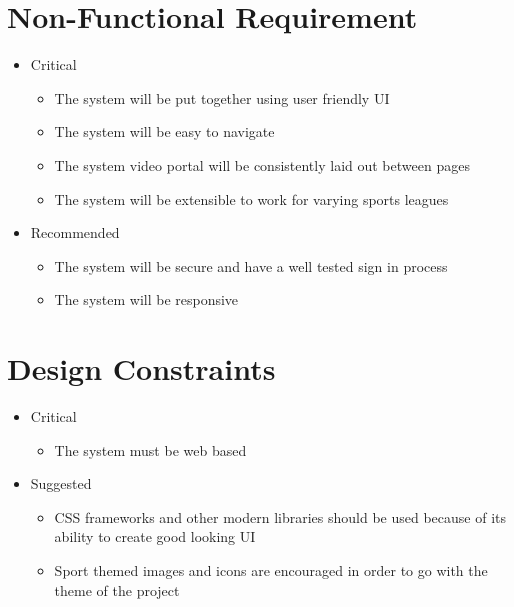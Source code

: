 \section{Non-Functional Requirement}
	\begin{itemize}
    \item Critical 
    	\begin{itemize}
    	\item The system will be put together using user friendly UI 
        \item The system will be  easy to  navigate 
        \item The system video portal will be consistently laid out between pages
        \item The system will be extensible to work for varying sports leagues        
    	\end{itemize}
    \item Recommended
    	\begin{itemize}
        \item The system will be secure and have a well tested sign in process 
        \item The system will be responsive 
    	\end{itemize}
	\end{itemize}
\section{Design Constraints}
	\begin{itemize}
    \item Critical
    	\begin{itemize}
    	\item The system must be web based 
    	\end{itemize}
	\item Suggested
    	\begin{itemize}
        \item CSS frameworks and other modern libraries should be used because of its ability to create good looking UI 
        \item Sport themed images and icons are encouraged in order to go with the theme of the project 
    	\end{itemize}
	\end{itemize}